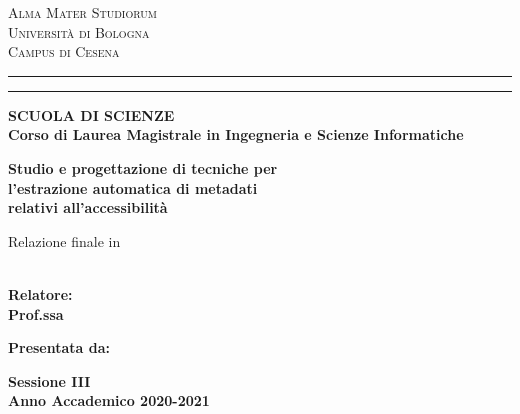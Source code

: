 
\oddsidemargin=25pt

\begin{titlepage}
\begin{center}
{{\Large{\textsc{Alma Mater Studiorum}}}\\
{\Large{\textsc{Universit\`a di Bologna}}} \\
{\textsc{Campus di Cesena}}} \rule[0.1cm]{14cm}{0.1mm}
		\rule[0.5cm]{14cm}{0.6mm}
{\small{\bf SCUOLA DI SCIENZE\\
Corso di Laurea Magistrale in Ingegneria e Scienze Informatiche }}
\end{center}
\vspace{15mm}
\begin{center}
{\LARGE{\bf Studio e progettazione di tecniche per}}\\
\vspace{2mm}
{\LARGE{\bf l'estrazione automatica di metadati}}\\
\vspace{2mm}
{\LARGE{\bf relativi all'accessibilità}}\\
\end{center}
\vspace{3mm}
\begin{center}
{Relazione finale in}\\
\vspace{2mm}
{\bf \xsubject}\\
\end{center}
\vspace{20mm}
\par
\noindent
\begin{minipage}[t]{0.5\textwidth}
{\large{\bf Relatore:\\
Prof.ssa \xsupervisor}} \\
\end{minipage}
\hfill
\begin{minipage}[t]{0.47\textwidth}\raggedleft
{\large{\bf Presentata da:\\
\xstudent}}
\end{minipage}
\vspace{30mm}
\begin{center}
{\large{\bf Sessione III\\%
Anno Accademico 2020-2021}}%
\end{center}

\newpage
\clearpage{\pagestyle{empty}\cleardoublepage}
\end{titlepage}

